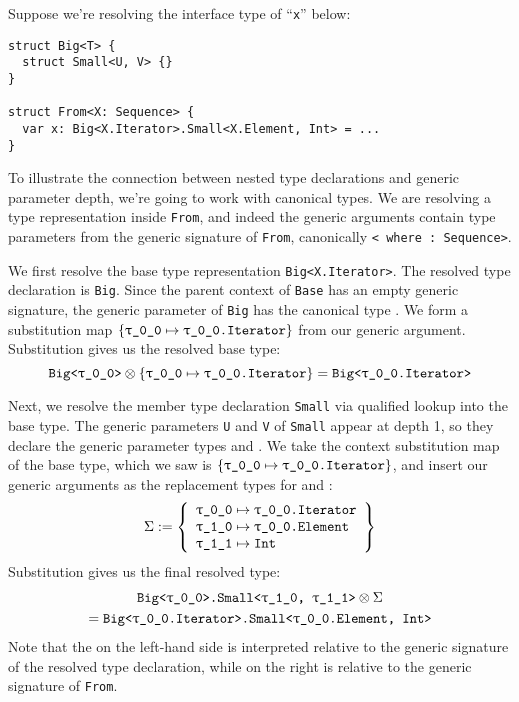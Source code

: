 \documentclass[../generics]{subfiles}
\begin{document}
\begin{example}
Suppose we're resolving the interface type of ``\texttt{x}'' below:
\begin{Verbatim}
struct Big<T> {
  struct Small<U, V> {}
}

struct From<X: Sequence> {
  var x: Big<X.Iterator>.Small<X.Element, Int> = ...
}
\end{Verbatim}
To illustrate the connection between nested type declarations and generic parameter depth, we're going to work with canonical types. We are resolving a type representation inside \texttt{From}, and indeed the generic arguments contain type parameters from the generic signature of \texttt{From}, canonically \texttt{< where :~Sequence>}.

We first resolve the base type representation \texttt{Big<X.Iterator>}. The resolved type declaration is \texttt{Big}. Since the parent context of \texttt{Base} has an empty generic signature, the generic parameter of \texttt{Big} has the canonical type . We form a substitution map $\SubstMap{\SubstType{\ttgp{0}{0}}{\ttgp{0}{0}.Iterator}}$ from our generic argument. Substitution gives us the resolved base type:
\[\texttt{Big<\ttgp{0}{0}>}\otimes\SubstMap{\SubstType{\ttgp{0}{0}}{\ttgp{0}{0}.Iterator}}=\texttt{Big<\ttgp{0}{0}.Iterator>}\]

Next, we resolve the member type declaration \texttt{Small} via qualified lookup into the base type. The generic parameters \texttt{U} and \texttt{V} of \texttt{Small} appear at depth 1, so they declare the generic parameter types  and . We take the context substitution map of the base type, which we saw is $\SubstMap{\SubstType{\ttgp{0}{0}}{\ttgp{0}{0}.Iterator}}$, and insert our generic arguments as the replacement types for  and :
\[\Sigma := \SubstMapLong{\SubstType{\ttgp{0}{0}}{\ttgp{0}{0}.Iterator}\\
\SubstType{\ttgp{1}{0}}{\ttgp{0}{0}.Element}\\
\SubstType{\ttgp{1}{1}}{Int}}
\]
Substitution gives us the final resolved type:
\begin{multline*}
\texttt{Big<\ttgp{0}{0}>.Small<\ttgp{1}{0}, \ttgp{1}{1}>}\otimes\Sigma\\
= \texttt{Big<\ttgp{0}{0}.Iterator>.Small<\ttgp{0}{0}.Element, Int>}
\end{multline*}
Note that the  on the left-hand side is interpreted relative to the generic signature of the resolved type declaration, while  on the right is relative to the generic signature of \texttt{From}.
\end{example}
\end{document}
